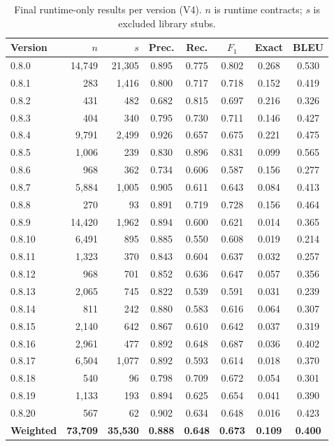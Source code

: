 \documentclass[10pt,conference]{article}
\begin{document}
\begin{table}[t]
\centering
\caption{Final runtime-only results per version (V4). $n$ is runtime contracts;
$s$ is excluded library stubs.}
\label{tab:perversion}
\scriptsize
\begin{tabular}{l r r c c c c c}
\toprule
Version & $n$ & $s$ & Prec. & Rec. & $F_1$ & Exact & BLEU \\
\midrule
0.8.0  & 14{,}749 & 21{,}305 & 0.895 & 0.775 & 0.802 & 0.268 & 0.530 \\
0.8.1  & 283      & 1{,}416  & 0.800 & 0.717 & 0.718 & 0.152 & 0.419 \\
0.8.2  & 431      & 482      & 0.682 & 0.815 & 0.697 & 0.216 & 0.326 \\
0.8.3  & 404      & 340      & 0.795 & 0.730 & 0.711 & 0.146 & 0.427 \\
0.8.4  & 9{,}791  & 2{,}499  & 0.926 & 0.657 & 0.675 & 0.221 & 0.475 \\
0.8.5  & 1{,}006  & 239      & 0.830 & 0.896 & 0.831 & 0.099 & 0.565 \\
0.8.6  & 968      & 362      & 0.734 & 0.606 & 0.587 & 0.156 & 0.277 \\
0.8.7  & 5{,}884  & 1{,}005  & 0.905 & 0.611 & 0.643 & 0.084 & 0.413 \\
0.8.8  & 270      & 93       & 0.891 & 0.719 & 0.728 & 0.156 & 0.464 \\
0.8.9  & 14{,}420 & 1{,}962  & 0.894 & 0.600 & 0.621 & 0.014 & 0.365 \\
0.8.10 & 6{,}491  & 895      & 0.885 & 0.550 & 0.608 & 0.019 & 0.214 \\
0.8.11 & 1{,}323  & 370      & 0.843 & 0.604 & 0.637 & 0.032 & 0.257 \\
0.8.12 & 968      & 701      & 0.852 & 0.636 & 0.647 & 0.057 & 0.356 \\
0.8.13 & 2{,}065  & 745      & 0.822 & 0.539 & 0.591 & 0.031 & 0.239 \\
0.8.14 & 811      & 242      & 0.880 & 0.583 & 0.616 & 0.064 & 0.307 \\
0.8.15 & 2{,}140  & 642      & 0.867 & 0.610 & 0.642 & 0.037 & 0.319 \\
0.8.16 & 2{,}961  & 477      & 0.892 & 0.648 & 0.687 & 0.036 & 0.402 \\
0.8.17 & 6{,}504  & 1{,}077  & 0.892 & 0.593 & 0.614 & 0.018 & 0.370 \\
0.8.18 & 540      & 96       & 0.798 & 0.709 & 0.672 & 0.054 & 0.301 \\
0.8.19 & 1{,}133  & 193      & 0.894 & 0.625 & 0.654 & 0.041 & 0.390 \\
0.8.20 & 567      & 62       & 0.902 & 0.634 & 0.648 & 0.016 & 0.423 \\
\midrule
\textbf{Weighted} & \textbf{73{,}709} & \textbf{35{,}530} & \textbf{0.888} & \textbf{0.648} & \textbf{0.673} & \textbf{0.109} & \textbf{0.400} \\
\bottomrule
\end{tabular}
\end{table}
\end{document}
